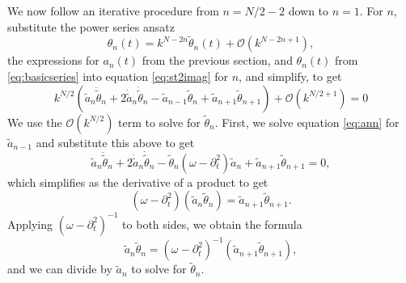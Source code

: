 \documentclass[11pt,reqno]{amsart}
\begin{document}
We now follow an iterative procedure from $n=N/2-2$ down to $n=1$. For $n$, substitute the power series ansatz
\[
\theta_{n}(t) = k^{N-2n} \tilde{\theta}_{n}(t) + \mathcal{O}(k^{N-2n+1}),
\]
the expressions for $a_n(t)$ from the previous section, and $\theta_n(t)$ from \cref{eq:basicseries} into equation \cref{eq:st2imag} for $n$, and simplify, to get
\[
k^{N/2} \left( \tilde{a}_n \ddot{\tilde{\theta}}_n + 2 \dot{\tilde{a}}_n \dot{\tilde{\theta}}_n
- \tilde{a}_{n-1} \tilde{\theta}_n + \tilde{a}_{n+1}\tilde{\theta}_{n+1} \right) + \mathcal{O}\left(k^{N/2+1}\right) = 0
\]
We use the $\mathcal{O}(k^{N/2})$ term to solve for $\tilde{\theta}_{n}$. First, we solve equation \cref{eq:ann} for $\tilde{a}_{n-1}$ and substitute this above to get
\[
\tilde{a}_n \ddot{\tilde{\theta}}_n + 2 \dot{\tilde{a}}_n \dot{\tilde{\theta}}_n
- \tilde{\theta}_n (\omega - \partial_t^2) \tilde{a}_n + \tilde{a}_{n+1} \tilde{\theta}_{n+1} = 0,
\]
which simplifies as the derivative of a product to get
\[
(\omega - \partial_t^2)\left( \tilde{a}_n \tilde{\theta}_n \right) = \tilde{a}_{n+1} \tilde{\theta}_{n+1}.
\]
Applying $(\omega - \partial_t^2)^{-1}$ to both sides, we obtain the formula
\begin{equation}\label{an2th}
\tilde{a}_n \tilde{\theta}_n = (\omega - \partial_t^2)^{-1} \left( \tilde{a}_{n+1} \tilde{\theta}_{n+1} \right),
\end{equation}
and we can divide by $\tilde{a}_n$ to solve for $\tilde{\theta}_n$. 



\end{document}
